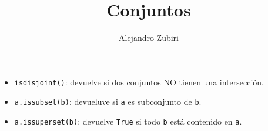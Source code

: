 \documentclass{article}
\author{Alejandro Zubiri}
\title{Conjuntos}
\begin{document}
\maketitle
\tableofcontents
\pagebreak
\begin{itemize}
	\item \verb|isdisjoint()|: devuelve si dos conjuntos NO tienen una intersección.
	\item \verb|a.issubset(b)|: devueluve si \verb|a| es subconjunto de \verb|b|.
	\item \verb|a.issuperset(b)|: devuelve \verb|True| si todo \verb|b| está contenido en \verb|a|.
\end{itemize}
\end{document}
